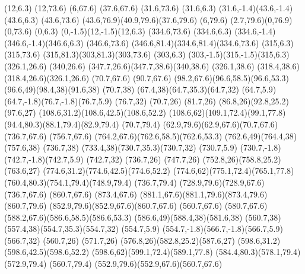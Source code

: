 {
{
\newpath
\moveto(12,6.3)
\lineto(12,73.6)
\lineto(6,67.6)
\lineto(37.6,67.6)
\lineto(31.6,73.6)
\lineto(31.6,6.3)
\curveto(31.6,-1.4)(43.6,-1.4)(43.6,6.3)
\lineto(43.6,73.6)
\curveto(43.6,76.9)(40.9,79.6)(37.6,79.6)
\lineto(6,79.6)
\curveto(2.7,79.6)(0,76.9)(0,73.6)
\lineto(0,6.3)
\curveto(0,-1.5)(12,-1.5)(12,6.3)
}
}
{
{
\newpath
\moveto(334.6,73.6)
\lineto(334.6,6.3)
\curveto(334.6,-1.4)(346.6,-1.4)(346.6,6.3)
\lineto(346.6,73.6)
\curveto(346.6,81.4)(334.6,81.4)(334.6,73.6)
}
}
{
{
\newpath
\moveto(315,6.3)
\lineto(315,73.6)
\curveto(315,81.3)(303,81.3)(303,73.6)
\lineto(303,6.3)
\curveto(303,-1.5)(315,-1.5)(315,6.3)
}
}
{
{
\newpath
\moveto(326.1,26.6)
\lineto(340,26.6)
\curveto(347.7,26.6)(347.7,38.6)(340,38.6)
\lineto(326.1,38.6)
\curveto(318.4,38.6)(318.4,26.6)(326.1,26.6)
}
}
{
{
\newpath
\moveto(70.7,67.6)
\lineto(90.7,67.6)
\curveto(98.2,67.6)(96.6,58.5)(96.6,53.3)
\curveto(96.6,49)(98.4,38)(91.6,38)
\lineto(70.7,38)
\curveto(67.4,38)(64.7,35.3)(64.7,32)
\lineto(64.7,5.9)
\curveto(64.7,-1.8)(76.7,-1.8)(76.7,5.9)
\lineto(76.7,32)
\lineto(70.7,26)
\lineto(81.7,26)
\curveto(86.8,26)(92.8,25.2)(97.6,27)
\curveto(108.6,31.2)(108.6,42.5)(108.6,52.2)
\curveto(108.6,62)(109.1,72.4)(99.1,77.8)
\curveto(94.4,80.3)(88.1,79.4)(82.9,79.4)
\lineto(70.7,79.4)
\curveto(62.9,79.6)(62.9,67.6)(70.7,67.6)
}
}
{
{
\newpath
\moveto(736.7,67.6)
\lineto(756.7,67.6)
\curveto(764.2,67.6)(762.6,58.5)(762.6,53.3)
\curveto(762.6,49)(764.4,38)(757.6,38)
\lineto(736.7,38)
\curveto(733.4,38)(730.7,35.3)(730.7,32)
\lineto(730.7,5.9)
\curveto(730.7,-1.8)(742.7,-1.8)(742.7,5.9)
\lineto(742.7,32)
\lineto(736.7,26)
\lineto(747.7,26)
\curveto(752.8,26)(758.8,25.2)(763.6,27)
\curveto(774.6,31.2)(774.6,42.5)(774.6,52.2)
\curveto(774.6,62)(775.1,72.4)(765.1,77.8)
\curveto(760.4,80.3)(754.1,79.4)(748.9,79.4)
\lineto(736.7,79.4)
\curveto(728.9,79.6)(728.9,67.6)(736.7,67.6)
}
}
{
{
\newpath
\moveto(860.7,67.6)
\lineto(873.4,67.6)
\curveto(881.1,67.6)(881.1,79.6)(873.4,79.6)
\lineto(860.7,79.6)
\curveto(852.9,79.6)(852.9,67.6)(860.7,67.6)
}
}
{
{
\newpath
\moveto(560.7,67.6)
\lineto(580.7,67.6)
\curveto(588.2,67.6)(586.6,58.5)(586.6,53.3)
\curveto(586.6,49)(588.4,38)(581.6,38)
\lineto(560.7,38)
\curveto(557.4,38)(554.7,35.3)(554.7,32)
\lineto(554.7,5.9)
\curveto(554.7,-1.8)(566.7,-1.8)(566.7,5.9)
\lineto(566.7,32)
\lineto(560.7,26)
\lineto(571.7,26)
\curveto(576.8,26)(582.8,25.2)(587.6,27)
\curveto(598.6,31.2)(598.6,42.5)(598.6,52.2)
\curveto(598.6,62)(599.1,72.4)(589.1,77.8)
\curveto(584.4,80.3)(578.1,79.4)(572.9,79.4)
\lineto(560.7,79.4)
\curveto(552.9,79.6)(552.9,67.6)(560.7,67.6)
}
}
